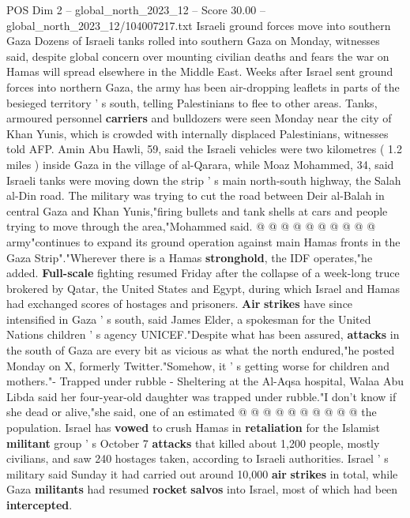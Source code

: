 \begin{textsample}{POS Dim 2 – global\_north\_2023\_12 – Score 30.00 – global\_north\_2023\_12/104007217.txt}  \label{ex:f2_pos_231}
Israeli ground forces move into southern Gaza Dozens of Israeli tanks rolled into southern Gaza on Monday, witnesses said, despite global concern over mounting civilian deaths and fears the war on Hamas will spread elsewhere in the Middle East.
Weeks after Israel sent ground forces into northern Gaza, the army has been air-dropping leaflets in parts of the besieged territory ' s south, telling Palestinians to flee to other areas.
Tanks, armoured personnel \textbf{carriers} and bulldozers were seen Monday near the city of Khan Yunis, which is crowded with internally displaced Palestinians, witnesses told AFP.
Amin Abu Hawli, 59, said the Israeli vehicles were two kilometres ( 1.2 miles ) inside Gaza in the village of al-Qarara, while Moaz Mohammed, 34, said Israeli tanks were moving down the strip ' s main north-south highway, the Salah al-Din road.
The military was trying to cut the road between Deir al-Balah in central Gaza and Khan Yunis,"firing bullets and tank shells at cars and people trying to move through the area,"Mohammed said. @ @ @ @ @ @ @ @ @ @ army"continues to expand its ground operation against main Hamas fronts in the Gaza Strip"."Wherever there is a Hamas \textbf{stronghold}, the IDF operates,"he added. \textbf{Full-scale} fighting resumed Friday after the collapse of a week-long truce brokered by Qatar, the United States and Egypt, during which Israel and Hamas had exchanged scores of hostages and prisoners. \textbf{Air} \textbf{strikes} have since intensified in Gaza ' s south, said James Elder, a spokesman for the United Nations children ' s agency UNICEF."Despite what has been assured, \textbf{attacks} in the south of Gaza are every bit as vicious as what the north endured,"he posted Monday on X, formerly Twitter."Somehow, it ' s getting worse for children and mothers."- Trapped under rubble - Sheltering at the Al-Aqsa hospital, Walaa Abu Libda said her four-year-old daughter was trapped under rubble."I don't know if she dead or alive,"she said, one of an estimated @ @ @ @ @ @ @ @ @ @ the population.
Israel has \textbf{vowed} to crush Hamas in \textbf{retaliation} for the Islamist \textbf{militant} group ' s October 7 \textbf{attacks} that killed about 1,200 people, mostly civilians, and saw 240 hostages taken, according to Israeli authorities.
Israel ' s military said Sunday it had carried out around 10,000 \textbf{air} \textbf{strikes} in total, while Gaza \textbf{militants} had resumed \textbf{rocket} \textbf{salvos} into Israel, most of which had been \textbf{intercepted}.

\end{textsample}
